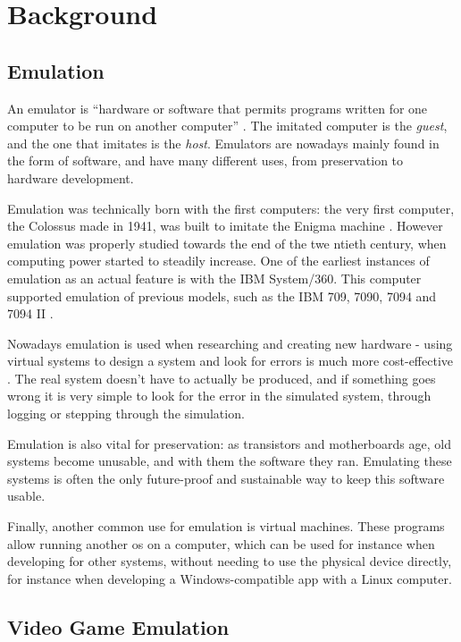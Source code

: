 \documentclass[11pt]{report}
\begin{document}
\chapter{Background}

\section{Emulation}

An emulator is ``hardware or software that permits programs written for one computer to be run on another computer'' \cite{emulator_def}. The imitated computer is the \textit{guest}, and the one that imitates is the \textit{host}. Emulators are nowadays mainly found in the form of software, and have many different uses, from preservation to hardware development.

Emulation was technically born with the first computers: the very first computer, the Colossus made in 1941, was built to imitate the Enigma machine \cite{emulator_origin}. However emulation was properly studied towards the end of the twe ntieth century, when computing power started to steadily increase. One of the earliest instances of emulation as an actual feature is with the IBM System/360. This computer supported emulation of previous models, such as the IBM 709, 7090, 7094 and 7094 II \cite{ibm_emulation}.

Nowadays emulation is used when researching and creating new hardware - using virtual systems to design a system and look for errors is much more cost-effective \cite{emu_in_design}. The real system doesn't have to actually be produced, and if something goes wrong it is very simple to look for the error in the simulated system, through logging or stepping through the simulation.

Emulation is also vital for preservation: as transistors and motherboards age, old systems become unusable, and with them the software they ran. Emulating these systems is often the only future-proof and sustainable way to keep this software usable.

Finally, another common use for emulation is virtual machines. These programs allow running another \gls{os} on a computer, which can be used for instance when developing for other systems, without needing to use the physical device directly, for instance when developing a Windows-compatible app with a Linux computer.

\section{Video Game Emulation}
\end{document}
